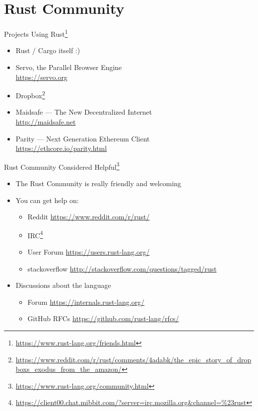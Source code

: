 \section{Rust Community}

\begin{frame}{Projects Using Rust\footnote{\url{https://www.rust-lang.org/friends.html}}}
\begin{itemize}
\item Rust / Cargo itself :)
\item Servo, the Parallel Browser Engine\\
  {\footnotesize\url{https://servo.org}}
\item Dropbox\footnote{\url{https://www.reddit.com/r/rust/comments/4adabk/the_epic_story_of_dropboxs_exodus_from_the_amazon/}}
\item Maidsafe --- The New Decentralized Internet\\
  {\footnotesize\url{http://maidsafe.net}}
\item Parity --- Next Generation Ethereum Client\\
  {\footnotesize\url{https://ethcore.io/parity.html}}
\end{itemize}
\end{frame}

\begin{frame}{Rust Community Considered Helpful\footnote{\url{https://www.rust-lang.org/community.html}}}
\begin{itemize}
\item The Rust Community is really friendly and welcoming
\item You can get help on:
    \begin{itemize}
        \item Reddit {\url{https://www.reddit.com/r/rust/}}
        \item IRC\footnote{\url{https://client00.chat.mibbit.com/?server=irc.mozilla.org&channel=\%23rust}}
        \item User Forum \url{https://users.rust-lang.org/}
        \item stackoverflow \url{http://stackoverflow.com/questions/tagged/rust}
    \end{itemize}
\item Discussions about the language
    \begin{itemize}
        \item Forum \url{https://internals.rust-lang.org/}
        \item GitHub RFCs \url{https://github.com/rust-lang/rfcs/}
    \end{itemize}
\end{itemize}
\end{frame}

